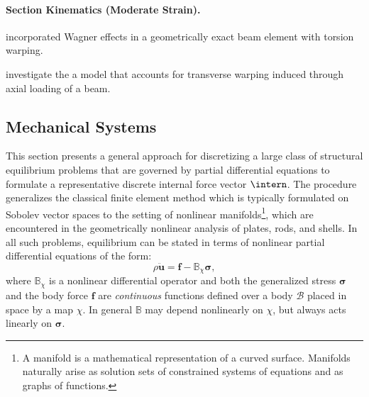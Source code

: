 \paragraph{Section Kinematics (Moderate Strain).}
\cite{rong2020geometrically} incorporated Wagner effects in a geometrically exact beam element with torsion warping.

\cite{chadha2019comprehensive} investigate the a model that accounts for transverse warping induced through axial loading of a beam.



\iffalse
\subsection{Mechanical Systems}

This section presents a general approach for discretizing a large class of structural equilibrium problems that are governed by partial differential equations to formulate a representative discrete internal force vector $\intern$. 
The procedure generalizes the classical finite element method which is typically formulated on Sobolev vector spaces \citep{hughes1987finite} to the setting of nonlinear manifolds{\footnote{A manifold is a mathematical representation of a curved surface. Manifolds naturally arise as solution sets of constrained systems of equations and as graphs of functions.}}, which are encountered in the geometrically nonlinear analysis of plates, rods, and shells.
In all such problems, equilibrium can be stated in terms of nonlinear partial differential equations of the form:
\begin{equation}
\rho \ddot{\bm{u}} = \bm{f} -  \mathbb{B}_\chi\bm{\sigma},
\label{eq:strong}
\end{equation}
where \(\mathbb{B}_\chi\) is a nonlinear
differential operator and both the generalized stress \(\bm{\sigma}\) and the body force \(\bm{f}\) are \emph{continuous} functions defined over a body \(\mathcal{B}\) placed in space by a
map \(\chi\). In general \(\mathbb{B}\) may depend nonlinearly on \(\chi\),
but always acts linearly on \(\bm{\sigma}\). 
\iftrue

